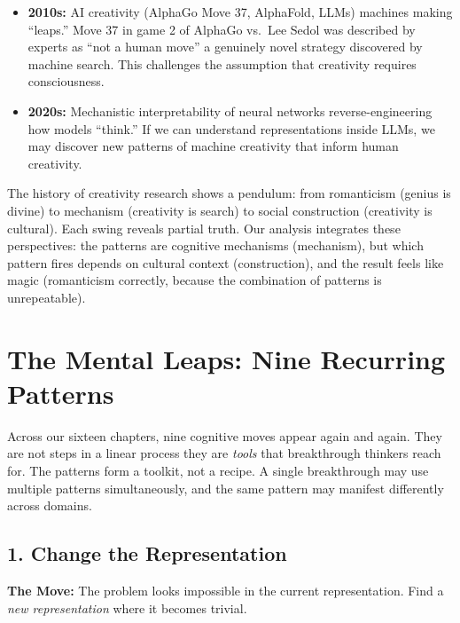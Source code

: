 \begin{itemize}
\item \textbf{2010s:} AI creativity (AlphaGo Move 37, AlphaFold, LLMs) machines making ``leaps.'' Move 37 in game 2 of AlphaGo vs.\ Lee Sedol was described by experts as ``not a human move'' a genuinely novel strategy discovered by machine search. This challenges the assumption that creativity requires consciousness.

\item \textbf{2020s:} Mechanistic interpretability of neural networks reverse-engineering how models ``think.'' If we can understand representations inside LLMs, we may discover new patterns of machine creativity that inform human creativity.
\end{itemize}

The history of creativity research shows a pendulum: from romanticism (genius is divine) to mechanism (creativity is search) to social construction (creativity is cultural). Each swing reveals partial truth. Our analysis integrates these perspectives: the patterns are cognitive mechanisms (mechanism), but which pattern fires depends on cultural context (construction), and the result feels like magic (romanticism correctly, because the combination of patterns is unrepeatable).

\section{The Mental Leaps: Nine Recurring Patterns}
\label{sec:anatomy:patterns}

Across our sixteen chapters, nine cognitive moves appear again and again. They are not steps in a linear process they are \emph{tools} that breakthrough thinkers reach for. The patterns form a toolkit, not a recipe. A single breakthrough may use multiple patterns simultaneously, and the same pattern may manifest differently across domains.

\subsection{1. Change the Representation}
\label{sec:anatomy:repr}

\textbf{The Move:} The problem looks impossible in the current representation. Find a \emph{new representation} where it becomes trivial.

